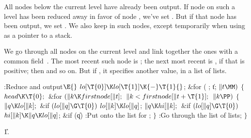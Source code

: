 All nodes below the current level have already been output.
If node  on such a level has been reduced away in favor of node ,
we've set . But if that node has been output, we set
. We also keep  in such nodes,
except temporarily
when using  as a pointer to a stack.

We go through all nodes on the current level and link together the
ones with a common  field~. The most recent such node
is ; the next most recent is , if
that is positive;
then  and so on.
But if , it specifies another  value, in
a list of lists.

\Y\B\4:Reduce and output\X${}\E{}$\6
$\\{lo}[\T{0}]\K\\{lo}[\T{1}]\K{-}\T{1}{}$;\6
\&{for} ( ; \|t; ${}\|t\MM){}$\5
${}\{{}$\1\6
${}\\{head}\K\T{0};{}$\6
\&{for} ${}(\|k\K\\{firstnode}[\|t];{}$ ${}\|k<\\{firstnode}[\|t+\T{1}];{}$ ${}%
\|k\PP){}$\5
${}\{{}$\1\6
${}\|q\K\\{lo}[\|k];{}$\6
\&{if} ${}(\\{lo}[\|q]\G\T{0}){}$\1\5
${}\\{lo}[\|k]\K\\{lo}[\|q]{}$;\2\6
${}\|q\K\\{hi}[\|k];{}$\6
\&{if} ${}(\\{lo}[\|q]\G\T{0}){}$\1\5
${}\\{hi}[\|k]\K\|q\K\\{lo}[\|q]{}$;\2\6
\&{if} (\|q)\1\5
:Put  onto the list for \X;\2\6
\4${}\}{}$\2\6
:Go through the list of lists\X;\6
\4${}\}{}$\2\par
\U1.\fi

